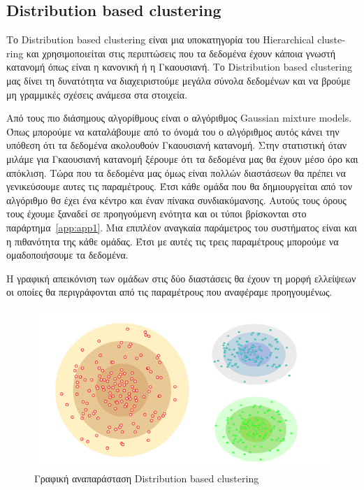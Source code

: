 \subsection{\textlatin{Distribution based clustering}}
Το \textlatin{Distribution based clustering} είναι μια υποκατηγορία του \textlatin{Hierarchical clustering} και χρησιμοποιείται στις περιπτώσεις που τα δεδομένα έχουν κάποια γνωστή κατανομή όπως
είναι η κανονική ή η Γκαουσιανή. Το \textlatin{Distribution based clustering} μας δίνει τη δυνατότητα να διαχειριστούμε μεγάλα σύνολα δεδομένων και να βρούμε μη γραμμικές σχέσεις ανάμεσα στα
στοιχεία\cite{hcdf}.\par Από τους πιο διάσημους αλγορίθμους είναι ο αλγόριθμος \textlatin{Gaussian mixture models}. Όπως μπορούμε να καταλάβουμε από το όνομά του ο αλγόριθμος αυτός κάνει την υπόθεση ότι τα δεδομένα ακολουθούν Γκαουσιανή
κατανομή. Στην στατιστική όταν μιλάμε για Γκαουσιανή κατανομή ξέρουμε ότι τα δεδομένα μας θα έχουν μέσο όρο και απόκλιση. Τώρα που τα δεδομένα μας όμως είναι πολλών διαστάσεων θα πρέπει να γενικεύσουμε αυτες τις παραμέτρους. Έτσι κάθε ομάδα
που θα δημιουργείται από τον αλγόριθμο θσ έχει ένα κέντρο και έναν πίνακα συνδιακύμανσης. Αυτούς τους όρους τους έχουμε ξαναδεί σε προηγούμενη ενότητα και οι τύποι βρίσκονται στο παράρτημα~\ref{app:app1}. Μια επιπλέον αναγκαία παράμετρος του
συστήματος είναι και η πιθανότητα της κάθε ομάδας. Έτσι με αυτές τις τρεις παραμέτρους μπορούμε να ομαδοποιήσουμε τα δεδομένα.\par Η γραφική απεικόνιση των ομάδων στις δύο διαστάσεις θα έχουν τη μορφή ελλείψεων οι οποίες θα περιγράφονται
από τις παραμέτρους που αναφέραμε προηγουμένως.
\begin{figure}[H]
    \centering
    \includegraphics[width=1\textwidth]{images/gaussian_clustering.png}
    \caption{Γραφική αναπαράσταση \textlatin{Distribution based clustering}}
\end{figure}